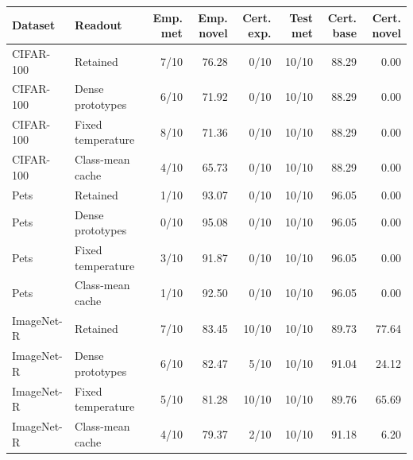 \begin{tabular}{llrrrrrr}
\toprule
Dataset & Readout & Emp. met & Emp. novel & Cert. exp. & Test met & Cert. base & Cert. novel \\
\midrule
CIFAR-100 & Retained & 7/10 & 76.28 & 0/10 & 10/10 & 88.29 & 0.00 \\
CIFAR-100 & Dense prototypes & 6/10 & 71.92 & 0/10 & 10/10 & 88.29 & 0.00 \\
CIFAR-100 & Fixed temperature & 8/10 & 71.36 & 0/10 & 10/10 & 88.29 & 0.00 \\
CIFAR-100 & Class-mean cache & 4/10 & 65.73 & 0/10 & 10/10 & 88.29 & 0.00 \\
\midrule
Pets & Retained & 1/10 & 93.07 & 0/10 & 10/10 & 96.05 & 0.00 \\
Pets & Dense prototypes & 0/10 & 95.08 & 0/10 & 10/10 & 96.05 & 0.00 \\
Pets & Fixed temperature & 3/10 & 91.87 & 0/10 & 10/10 & 96.05 & 0.00 \\
Pets & Class-mean cache & 1/10 & 92.50 & 0/10 & 10/10 & 96.05 & 0.00 \\
\midrule
ImageNet-R & Retained & 7/10 & 83.45 & 10/10 & 10/10 & 89.73 & 77.64 \\
ImageNet-R & Dense prototypes & 6/10 & 82.47 & 5/10 & 10/10 & 91.04 & 24.12 \\
ImageNet-R & Fixed temperature & 5/10 & 81.28 & 10/10 & 10/10 & 89.76 & 65.69 \\
ImageNet-R & Class-mean cache & 4/10 & 79.37 & 2/10 & 10/10 & 91.18 & 6.20 \\
\bottomrule
\end{tabular}
